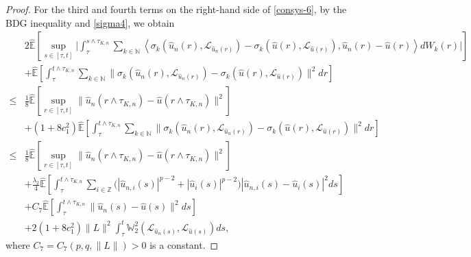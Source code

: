 \documentclass[10pt,a4paper]{amsart}
\begin{document}
\begin{proof}
  For the third and fourth terms on the right-hand side of \eqref{consys-6},
  by 
  the BDG inequality and \eqref{sigma4}, we obtain
  \begin{align}\label{consys-9}
         & 2 \widehat{\mathbb{E}}
                   \left[ \sup_{s \in [\tau,t]}
                          \Big| \int_{\tau}^{s \wedge \tau_{K,n}}
                                   \sum_{k \in \mathbb{N} }
                                      \left\langle \sigma_k(\hat{u}_n(r),\mathcal{L}_{\hat{u}_n(r)}) - \sigma_k(\hat{u}(r),\mathcal{L}_{\hat{u}(r)}),
                                                   \hat{u}_n(r) - \hat{u}(r)
                                      \right\rangle dW_k(r)
                          \Big|
                   \right]  \nonumber\\
          & + \widehat{\mathbb{E}}
                 \left[ \int_{\tau}^{t \wedge \tau_{K,n}}
                           \sum_{k \in \mathbb{N} }
                              \|\sigma_k(\hat{u}_n(r),\mathcal{L}_{\hat{u}_n(r)}) - \sigma_k(\hat{u}(r),\mathcal{L}_{\hat{u}(r)})\|^2 dr
                 \right]  \nonumber\\
     \le & \frac{1}{8} \widehat{\mathbb{E}}
                        \left[ \sup_{r \in [\tau, t]}
                                   \| \hat{u}_n(r \wedge \tau_{K,n}) - \hat{u}(r \wedge \tau_{K,n}) \|^2
                        \right]  \nonumber\\
          & + \left( 1 + 8 c_1^2 \right)
              \widehat{\mathbb{E}}
                    \left[ \int_{\tau}^{t \wedge \tau_{K,n}}
                              \sum_{k \in \mathbb{N} }
                                    \| \sigma_k(\hat{u}_n(r),\mathcal{L}_{\hat{u}_n(r)}) - \sigma_k(\hat{u}(r),\mathcal{L}_{\hat{u}(r)})\|^2 dr
                    \right]  \nonumber\\
     \le & \frac{1}{8} \widehat{\mathbb{E}}
                        \left[ \sup_{r \in [\tau, t]}
                                   \| \hat{u}_n(r \wedge \tau_{K,n}) - \hat{u}(r \wedge \tau_{K,n}) \|^2
                        \right]  \nonumber\\
          & + \frac{\lambda_2}{4} \widehat{\mathbb{E}}
                  \left[ \int_{\tau}^{t \wedge \tau_{K,n}}
                            \sum_{i \in \mathbb{Z}}
                                \Big( |\hat{u}_{n,i}(s)|^{p-2} + |\hat{u}_i(s)|^{p-2} \Big)
                                | \hat{u}_{n,i}(s) - \hat{u}_i(s) |^2 ds
                  \right]  \nonumber\\
          & + C_7 
                 \widehat{\mathbb{E}}
                    \left[ \int_{\tau}^{t \wedge \tau_{K,n}}
                                 \|\hat{u}_n(s) - \hat{u}(s)\|^2 ds
                    \right]  \nonumber\\
          & + 2 \left( 1 + 8 c_1^2 \right) \| L \|^2
                \int_{\tau}^{t} \mathbb{W}_2^2(\mathcal{L}_{\hat{u}_n(s)},\mathcal{L}_{\hat{u}(s)}) ds,
 \end{align}
 where $C_7 = C_7(p, q, \|L\|) > 0$ is a constant.
 

\end{proof}
\end{document}
